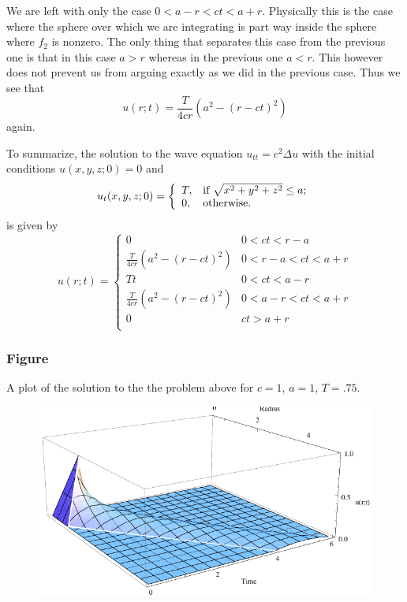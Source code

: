 \documentclass[12pt]{article}
\begin{document}
We are left with only the case $0<a-r<c t < a+r$. Physically this is the case where the sphere over which we are integrating is part way inside the sphere where $f_2$ is nonzero. The only thing that separates this case from the previous one is that in this case $a>r$ whereas in the previous one $a<r$. This however does not prevent us from arguing exactly as we did in the previous case. Thus we see that 
\[u(r;t) =  \frac{   T}{ 4  c r}  (a^2 - (r-c t)^2)  \]
again.

To summarize, the solution to the wave equation $u_{tt} = c^2 \Delta u$ with the initial conditions $u(x,y,z;0)=0$ and
\[u_t(x,y,z;0)= \left\{
\begin{array}{ll}
T, & $if $ \sqrt{x^2+y^2+z^2} \leq a; \\
0, & $otherwise.$
\end{array}
\right.
\]
is given by
\[u(r;t)=\left\{\begin{array}{lr}
0 & 0<c t<r-a \\
\frac{   T}{ 4  c r}  (a^2 - (r-c t)^2) & 0<r-a<c t<a+r \\
Tt & 0<ct<a-r\\
\frac{   T}{ 4  c r}  (a^2 - (r-c t)^2) & 0<a-r<c t<a+r \\
0 & c t>a+r \\
\end{array}
\right.
\]

\subsubsection{Figure}
A plot of the solution to the the problem above for $c = 1$, $a = 1$, $T = .75$.
\begin{figure}[htp]
\centering
\includegraphics{13solution.pdf}
\label{13:solution}
\end{figure}
\end{document}
